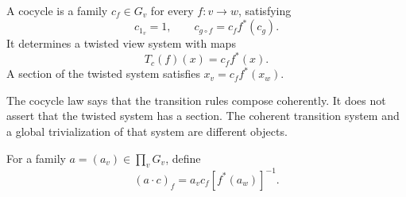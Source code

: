 \begin{KSdefinition}[Cocycle]
A cocycle is a family \(c_f\in G_v\) for every \(f:v\to w\), satisfying
\[
 c_{1_v}=1,\qquad c_{g\circ f}=c_f f^*(c_g).
\]
It determines a twisted view system with maps
\[
 T_c(f)(x)=c_f f^*(x).
\]
A section of the twisted system satisfies \(x_v=c_f f^*(x_w)\).
\end{KSdefinition}
The cocycle law says that the transition rules compose coherently. It does not assert that the twisted system has a section. The coherent transition system and a global trivialization of that system are different objects.

For a family \(a=(a_v)\in\prod_vG_v\), define
\begin{equation}\label{KS:eq:gauge}
 (a\cdot c)_f=a_vc_f[f^*(a_w)]^{-1}.
\end{equation}

